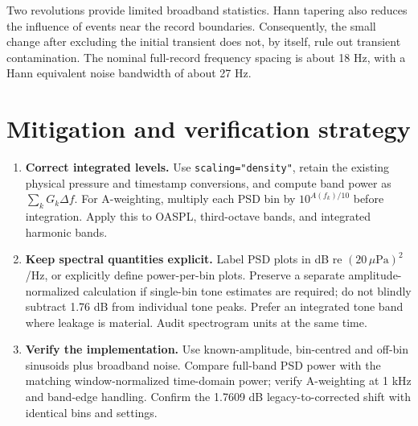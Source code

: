 \documentclass[english]{achleitner-report}
\begin{document}
Two revolutions provide limited broadband statistics. Hann tapering also reduces the influence of events near the record boundaries. Consequently, the small change after excluding the initial transient does not, by itself, rule out transient contamination. The nominal full-record frequency spacing is about 18 Hz, with a Hann equivalent noise bandwidth of about 27 Hz.

\section{Mitigation and verification strategy}
\begin{enumerate}
\item \textbf{Correct integrated levels.} Use \texttt{scaling="density"}, retain the existing physical pressure and timestamp conversions, and compute band power as $\sum_k G_k\Delta f$. For A-weighting, multiply each PSD bin by $10^{A(f_k)/10}$ before integration. Apply this to OASPL, third-octave bands, and integrated harmonic bands.
\item \textbf{Keep spectral quantities explicit.} Label PSD plots in dB re $(20\,\mu\mathrm{Pa})^2$/Hz, or explicitly define power-per-bin plots. Preserve a separate amplitude-normalized calculation if single-bin tone estimates are required; do not blindly subtract 1.76 dB from individual tone peaks. Prefer an integrated tone band where leakage is material. Audit spectrogram units at the same time.
\item \textbf{Verify the implementation.} Use known-amplitude, bin-centred and off-bin sinusoids plus broadband noise. Compare full-band PSD power with the matching window-normalized time-domain power; verify A-weighting at 1 kHz and band-edge handling. Confirm the 1.7609 dB legacy-to-corrected shift with identical bins and settings.
\end{enumerate}
\clearpage
\end{document}
